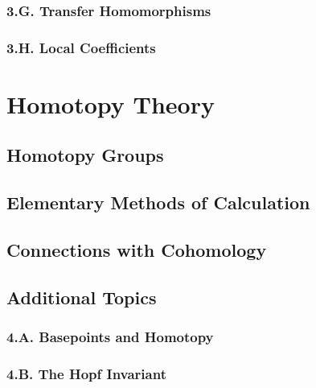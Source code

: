 \documentclass{article}
\begin{document}
\subsubsection*{3.G. Transfer Homomorphisms}

\subsubsection*{3.H. Local Coefficients}

\newpage

\section{Homotopy Theory}

\subsection{Homotopy Groups}

\subsection{Elementary Methods of Calculation}

\subsection{Connections with Cohomology}

\subsection*{Additional Topics}

\subsubsection*{4.A. Basepoints and Homotopy}

\subsubsection*{4.B. The Hopf Invariant}
\end{document}
